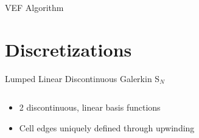 \documentclass[10pt]{beamer}
\newcommand{\SN}{S$_N$\xspace}
\begin{document}
\begin{frame}{VEF Algorithm}

	\begin{figure}

		\only<2>{\def\svgwidth{.8\textwidth}}

	\end{figure}

\end{frame}

\section{Discretizations}

\begin{frame}{Lumped Linear Discontinuous Galerkin \SN}

	\begin{columns}

		\begin{column}{.5\textwidth}
		\vspace{.1in}
		\begin{itemize}

			\item 
			2 discontinuous, linear basis functions 

			\item 
			Cell edges uniquely defined through upwinding 


		\end{itemize}
		\end{column}
		\begin{column}{.5\textwidth}

			\begin{figure}

				\def\svgwidth{\textwidth}
				
				
			\end{figure}

		\end{column}

	\end{columns} 

	\begin{columns}
	\begin{column}{1.06\textwidth}
	\begin{itemize}


\end{itemize}
\end{column}
\end{columns}
\end{frame}
\end{document}
